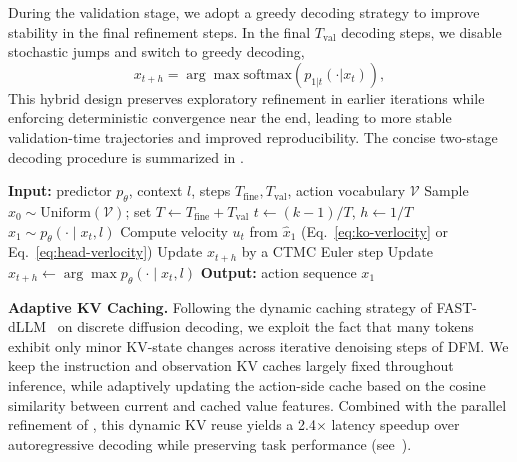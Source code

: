 \noindent
During the validation stage, we adopt a greedy decoding strategy to improve stability in the final refinement steps. 
In the final $T_{\mathrm{val}}$ decoding steps, we disable stochastic jumps and switch to greedy decoding,
\begin{equation}
    x_{t+h} = \arg\max \mathrm{softmax}(p_{1|t}(\cdot | x_t)),
\end{equation}
This hybrid design preserves exploratory refinement in earlier iterations while enforcing deterministic convergence near the end, leading to more stable validation-time trajectories and improved reproducibility. 
The concise two-stage decoding procedure is summarized in .

\begin{algorithm}[b]
\caption{Two-Stage Decoding of \method}
\label{alg:two_stage_sampling}
\begin{algorithmic}[1]
\STATE \textbf{Input:} predictor $p_\theta$, context $l$, steps $T_{\mathrm{fine}},T_{\mathrm{val}}$, action vocabulary $\mathcal{V}$
\STATE Sample $x_0 \sim \mathrm{Uniform}(\mathcal{V})$; set $T \gets T_{\mathrm{fine}} + T_{\mathrm{val}}$
    \STATE $t \gets (k-1)/T$, $h \gets 1/T$
    \STATE $\hat{x}_1 \sim p_\theta(\cdot \mid x_t, l)$
        \STATE Compute velocity $u_t$ from $\hat{x}_1$ (Eq.~\ref{eq:ko-verlocity} or Eq.~\ref{eq:head-verlocity})
        \STATE Update $x_{t+h}$ by a  CTMC Euler step
    \ELSE
        \STATE Update $x_{t+h} \gets \arg\max p_\theta(\cdot \mid x_t, l)$
    \ENDIF
\ENDFOR
\STATE \textbf{Output:}  action sequence $x_1$
\end{algorithmic}
\end{algorithm}

\noindent
\textbf{Adaptive KV Caching.}
Following the dynamic caching strategy of FAST-dLLM~\citep{wu2025fast} on discrete diffusion decoding, we exploit the fact that many tokens exhibit only minor KV-state changes across iterative denoising steps of DFM. 
We keep the instruction and observation KV caches largely fixed throughout inference, while adaptively updating the action-side cache based on the cosine similarity between current and cached value features.
Combined with the parallel refinement of \method, this dynamic KV reuse yields a 2.4$\times$ latency speedup over autoregressive decoding while preserving task performance (see~).


